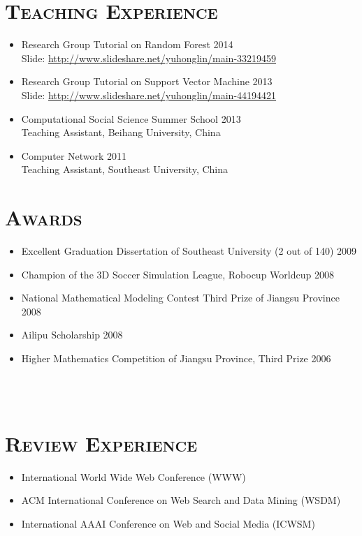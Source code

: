 \begin{resume}
\section{\textsc{Teaching Experience}}
\begin{itemize}
\item Research Group Tutorial on Random Forest \hfill 2014 \\
  Slide: \url{http://www.slideshare.net/yuhonglin/main-33219459}
\item Research Group Tutorial on Support Vector Machine \hfill 2013 \\
  Slide: \url{http://www.slideshare.net/yuhonglin/main-44194421}  
  \item Computational Social Science Summer School  \hfill 2013 \\
    Teaching Assistant, Beihang University, China
  \item Computer Network \hfill 2011 \\
    Teaching Assistant, Southeast University, China
\end{itemize} 


\section{\textsc{Awards}}
\begin{itemize}
\item Excellent Graduation Dissertation of Southeast University (2 out of 140) \hfill  2009
\item Champion of the 3D Soccer Simulation League, Robocup Worldcup \hfill 2008
\item National Mathematical Modeling Contest Third Prize of Jiangsu Province \hfill  2008
\item Ailipu Scholarship \hfill  2008
\item Higher Mathematics Competition of Jiangsu Province, Third Prize \hfill 2006
\end{itemize}

\begin{formatb}
  \\
  \body\\
\end{formatb}

\section{\textsc{Review Experience}}
\begin{itemize}
  \item International World Wide Web Conference (WWW)
  \item ACM International Conference on Web Search and Data Mining (WSDM)
  \item International AAAI Conference on Web and Social Media (ICWSM)
\end{itemize}



\end{resume}
